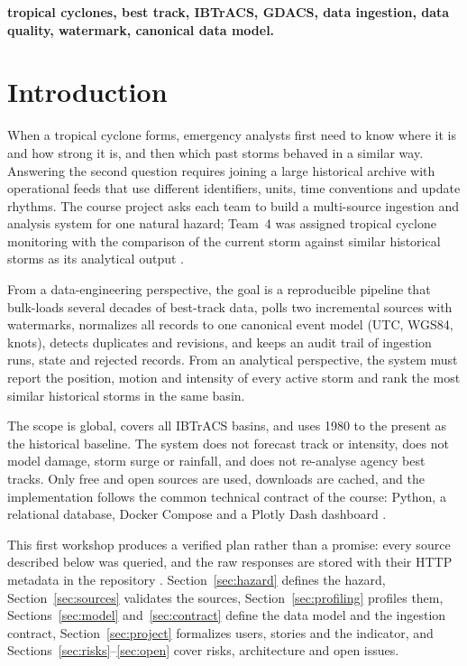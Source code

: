 \documentclass[10pt,twocolumn,letterpaper]{article}
\begin{document}
\vspace{4pt}
\textbf{\textemdash tropical cyclones, best track, IBTrACS, GDACS, data ingestion, data quality, watermark, canonical data model.}

\section{Introduction}

When a tropical cyclone forms, emergency analysts first need to know where it is and how strong it is, and then which past storms behaved in a similar way. Answering the second question requires joining a large historical archive with operational feeds that use different identifiers, units, time conventions and update rhythms. The course project asks each team to build a multi-source ingestion and analysis system for one natural hazard; Team~4 was assigned tropical cyclone monitoring with the comparison of the current storm against similar historical storms as its analytical output \cite{teams}.

From a data-engineering perspective, the goal is a reproducible pipeline that bulk-loads several decades of best-track data, polls two incremental sources with watermarks, normalizes all records to one canonical event model (UTC, WGS84, knots), detects duplicates and revisions, and keeps an audit trail of ingestion runs, state and rejected records. From an analytical perspective, the system must report the position, motion and intensity of every active storm and rank the most similar historical storms in the same basin.

The scope is global, covers all IBTrACS basins, and uses 1980 to the present as the historical baseline. The system does not forecast track or intensity, does not model damage, storm surge or rainfall, and does not re-analyse agency best tracks. Only free and open sources are used, downloads are cached, and the implementation follows the common technical contract of the course: Python, a relational database, Docker Compose and a Plotly Dash dashboard \cite{teams}.

This first workshop produces a verified plan rather than a promise: every source described below was queried, and the raw responses are stored with their HTTP metadata in the repository \cite{ws1}. Section~\ref{sec:hazard} defines the hazard, Section~\ref{sec:sources} validates the sources, Section~\ref{sec:profiling} profiles them, Sections~\ref{sec:model} and~\ref{sec:contract} define the data model and the ingestion contract, Section~\ref{sec:project} formalizes users, stories and the indicator, and Sections~\ref{sec:risks}--\ref{sec:open} cover risks, architecture and open issues.
\end{document}
